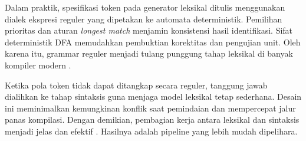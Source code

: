 \documentclass[../main.tex]{subfiles}
\begin{document}
Dalam praktik, spesifikasi token pada generator leksikal ditulis menggunakan dialek ekspresi reguler yang dipetakan ke automata deterministik. Pemilihan prioritas dan aturan \emph{longest match} menjamin konsistensi hasil identifikasi. Sifat deterministik DFA memudahkan pembuktian korektitas dan pengujian unit. Oleh karena itu, grammar reguler menjadi tulang punggung tahap leksikal di banyak kompiler modern \citep{FlexManual}.


Ketika pola token tidak dapat ditangkap secara reguler, tanggung jawab dialihkan ke tahap sintaksis guna menjaga model leksikal tetap sederhana. Desain ini meminimalkan kemungkinan konflik saat pemindaian dan mempercepat jalur panas kompilasi. Dengan demikian, pembagian kerja antara leksikal dan sintaksis menjadi jelas dan efektif \citep{WikiRegex}. Hasilnya adalah pipeline yang lebih mudah dipelihara.

\IfSubfilesClassLoaded{


}{}
\end{document}
